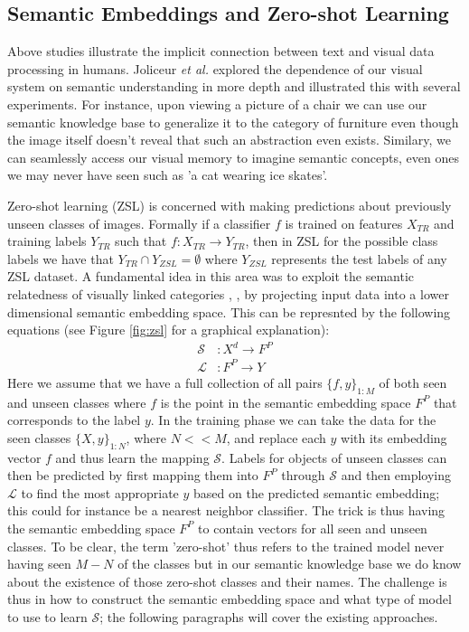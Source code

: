 \documentclass[12pt]{report}
\begin{document}
\subsection{Semantic Embeddings and Zero-shot Learning}
Above studies illustrate the implicit connection between text and visual data processing in humans. Joliceur \textit{et al.} \cite{Joliceur1984} explored the dependence of our visual system on semantic understanding in more depth and illustrated this with several experiments. For instance, upon viewing a picture of a chair we can use our semantic knowledge base to generalize it to the category of furniture even though the image itself doesn't reveal that such an abstraction even exists. Similary, we can seamlessly access our visual memory to imagine semantic concepts, even ones we may never have seen such as 'a cat wearing ice skates'.

Zero-shot learning (ZSL) \cite{Palatucci2009} is concerned with making predictions about previously unseen classes of images. Formally if a classifier $f$ is trained on features $X_{TR}$ and training labels $Y_{TR}$ such that $f:X_{TR} \rightarrow Y_{TR}$, then in ZSL for the possible class labels we have that $Y_{TR} \cap Y_{ZSL} = \emptyset$ where $Y_{ZSL}$ represents the test labels of any ZSL dataset. A fundamental idea in this area was to exploit the semantic relatedness of visually linked categories \cite{Monay2004}, \cite{Weston2010}, \cite{Palatucci2009} by projecting input data into a lower dimensional semantic embedding space. This can be represnted by the following equations \cite{Palatucci2009} (see Figure \ref{fig:zsl} for a graphical explanation):
\begin{align} \label{zsl_eq}
  \mathcal{S} &: X^d \rightarrow F^P \\
  \mathcal{L} &: F^P \rightarrow Y
\end{align}
Here we assume that we have a full collection of all pairs $\{f, y\}_{1:M}$ of both seen and unseen classes where $f$ is the point in the semantic embedding space $F^P$ that corresponds to the label $y$. In the training phase we can take the data for the seen classes $\{X, y\}_{1:N}$, where $N<<M$, and replace each $y$ with its embedding vector $f$ and thus learn the mapping $\mathcal{S}$. Labels for objects of unseen classes can then be predicted by first mapping them into $F^P$ through $\mathcal{S}$ and then employing $\mathcal{L}$ to find the most appropriate $y$ based on the predicted semantic embedding; this could for instance be a nearest neighbor classifier. The trick is thus having the semantic embedding space $F^P$ to contain vectors for all seen and unseen classes. To be clear, the term 'zero-shot' thus refers to the trained model never having seen $M-N$ of the classes but in our semantic knowledge base we do know about the existence of those zero-shot classes and their names. The challenge is thus in how to construct the semantic embedding space and what type of model to use to learn $\mathcal{S}$; the following paragraphs will cover the existing approaches.
\end{document}
